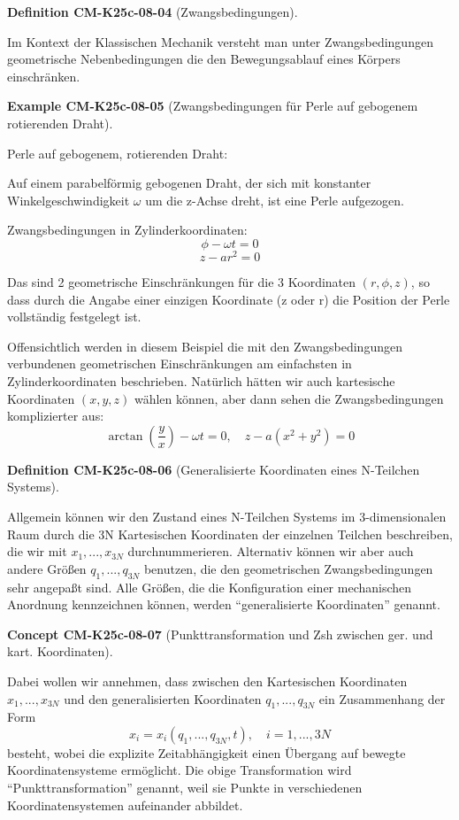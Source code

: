 \documentclass[10pt, letterpaper]{article}
\newcommand{\CustomHeading}[3]{%
  \par\medskip\noindent%
  \textbf{#1 #2} \textnormal{(#3)}.\enskip%
}
\newenvironment{DEF}[2]{\CustomHeading{Definition}{#1}{#2}}{}
\newenvironment{EXA}[2]{\CustomHeading{Example}{#1}{#2}}{}
\newenvironment{CONC}[2]{\CustomHeading{Concept}{#1}{#2}}{}
\begin{document}
\begin{DEF}{CM-K25c-08-04}{Zwangsbedingungen}
Im Kontext der Klassischen Mechanik versteht man unter Zwangsbedingungen geometrische Nebenbedingungen die den Bewegungsablauf eines Körpers einschränken.
\end{DEF}

\begin{EXA}{CM-K25c-08-05}{Zwangsbedingungen für Perle auf gebogenem rotierenden Draht}
Perle auf gebogenem, rotierenden Draht:

Auf einem parabelförmig gebogenen Draht, der sich mit konstanter Winkelgeschwindigkeit $\omega$ um die z-Achse dreht, ist eine Perle aufgezogen.

Zwangsbedingungen in Zylinderkoordinaten:
\[\phi - \omega t = 0\]
\[z - ar^2 = 0\]

Das sind 2 geometrische Einschränkungen für die 3 Koordinaten $(r,\phi,z)$, so dass durch die Angabe einer einzigen Koordinate (z oder r) die Position der Perle vollständig festgelegt ist.

Offensichtlich werden in diesem Beispiel die mit den Zwangsbedingungen verbundenen geometrischen Einschränkungen am einfachsten in Zylinderkoordinaten beschrieben. Natürlich hätten wir auch kartesische Koordinaten $(x,y,z)$ wählen können, aber dann sehen die Zwangsbedingungen komplizierter aus:
\[\arctan(\frac{y}{x})-\omega t = 0, \quad z-a(x^2+y^2) = 0\]
\end{EXA}

\begin{DEF}{CM-K25c-08-06}{Generalisierte Koordinaten eines N-Teilchen Systems}
Allgemein können wir den Zustand eines N-Teilchen Systems im 3-dimensionalen Raum durch die 3N Kartesischen Koordinaten der einzelnen Teilchen beschreiben, die wir mit $x_1,...,x_{3N}$ durchnummerieren. Alternativ können wir aber auch andere Größen $q_1,...,q_{3N}$ benutzen, die den geometrischen Zwangsbedingungen sehr angepaßt sind. Alle Größen, die die Konfiguration einer mechanischen Anordnung kennzeichnen können, werden ``generalisierte Koordinaten'' genannt.
\end{DEF}

\begin{CONC}{CM-K25c-08-07}{Punkttransformation und Zsh zwischen ger. und kart. Koordinaten}
Dabei wollen wir annehmen, dass zwischen den Kartesischen Koordinaten $x_1,...,x_{3N}$ und den generalisierten Koordinaten $q_1,...,q_{3N}$ ein Zusammenhang der Form
\[x_i = x_i(q_1,...,q_{3N},t), \quad i=1,...,3N\]
besteht, wobei die explizite Zeitabhängigkeit einen Übergang auf bewegte Koordinatensysteme ermöglicht. Die obige Transformation wird ``Punkttransformation'' genannt, weil sie Punkte in verschiedenen Koordinatensystemen aufeinander abbildet.
\end{CONC}
\end{document}
